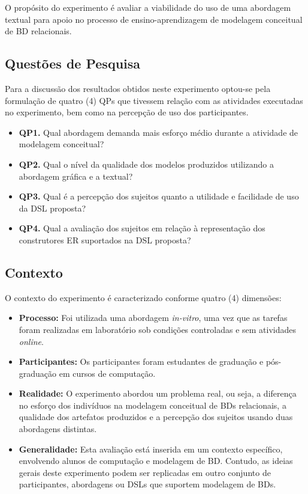 O propósito do experimento é avaliar a viabilidade do uso de uma abordagem textual para apoio no processo de ensino-aprendizagem de modelagem conceitual de \ac{BD} relacionais.

\subsection{Questões de Pesquisa} \label{ssec:questPesq}
Para a discussão dos resultados obtidos neste experimento optou-se pela formulação de quatro (4) \acp{QP} que tivessem relação com as atividades executadas no experimento, bem como na percepção de uso dos participantes. 
\begin{itemize}
    \small
    \item \textbf{QP1.} Qual abordagem demanda mais esforço médio durante a atividade de modelagem conceitual?
    \item \textbf{QP2.} Qual o nível da qualidade dos modelos produzidos utilizando a abordagem gráfica e a textual?
    \item \textbf{QP3.} Qual é a percepção dos sujeitos quanto a utilidade e facilidade de uso da \ac{DSL} proposta?
    \item \textbf{QP4.} Qual a avaliação dos sujeitos em relação à representação dos construtores \ac{ER} suportados na \ac{DSL} proposta?
\end{itemize}

\subsection{Contexto} \label{ssec:contxExp}

O contexto do experimento é caracterizado conforme quatro (4) dimensões:

\begin{itemize}
    \item \textbf{Processo:} Foi utilizada uma abordagem \textit{in-vitro}, uma vez que as tarefas foram realizadas em laboratório sob condições controladas e sem atividades \textit{online}.
    \item \textbf{Participantes:} Os participantes foram estudantes de graduação e pós-graduação em cursos de computação.
    \item \textbf{Realidade:} O experimento abordou um problema real, ou seja, a diferença no esforço dos indivíduos na modelagem conceitual de \acp{BD} relacionais, a qualidade dos artefatos produzidos e a percepção dos sujeitos usando duas abordagens distintas.
    \item \textbf{Generalidade:} Esta avaliação está inserida em um contexto específico, envolvendo alunos de computação e modelagem de \ac{BD}. Contudo, as ideias gerais deste experimento podem ser replicadas em outro conjunto de participantes, abordagens ou \acp{DSL} que suportem modelagem de \acp{BD}.
\end{itemize}

